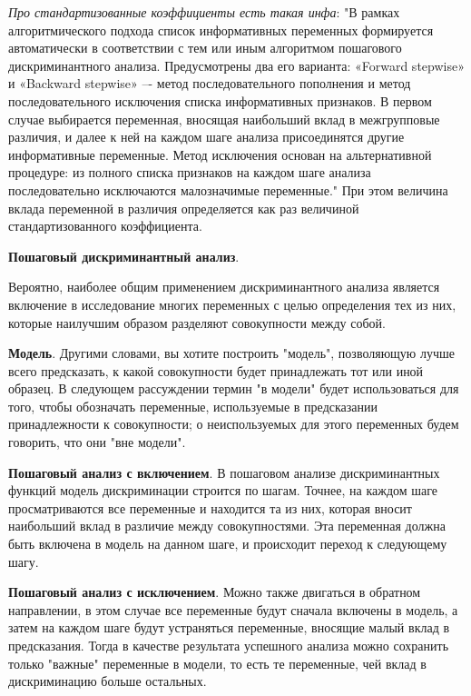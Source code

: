 \documentclass[a4paper, 12pt]{article}
\begin{document}
{\it Про стандартизованные коэффициенты есть такая инфа}: "В рамках алгоритмического подхода список информативных
переменных формируется автоматически в соответствии с тем
или иным алгоритмом пошагового дискриминантного анализа.
Предусмотрены два его варианта: «Forward stepwise» и
«Backward stepwise» –- метод последовательного пополнения и
метод последовательного исключения списка информативных
признаков. В первом случае выбирается переменная, вносящая
наибольший вклад в межгрупповые различия, и далее к ней на
каждом шаге анализа присоединятся другие информативные переменные. Метод исключения основан на альтернативной процедуре: из полного списка признаков на каждом шаге анализа последовательно исключаются малозначимые переменные." При этом величина вклада переменной в различия определяется как раз величиной стандартизованного коэффициента.

\textbf{Пошаговый дискриминантный анализ}.

Вероятно, наиболее общим применением дискриминантного анализа является включение в исследование многих переменных с целью определения тех из них, которые наилучшим образом разделяют совокупности между собой.

\textbf{Модель}. Другими словами, вы хотите построить "модель", позволяющую лучше всего предсказать, к какой совокупности будет принадлежать тот или иной образец. В следующем рассуждении термин "в модели" будет использоваться для того, чтобы обозначать переменные, используемые в предсказании принадлежности к совокупности; о неиспользуемых для этого переменных будем говорить, что они "вне модели".

\textbf{Пошаговый анализ с включением}. В пошаговом анализе дискриминантных функций модель дискриминации строится по шагам. Точнее, на каждом шаге просматриваются все переменные и находится та из них, которая вносит наибольший вклад в различие между совокупностями. Эта переменная должна быть включена в модель на данном шаге, и происходит переход к следующему шагу.

\textbf{Пошаговый анализ с исключением}. Можно также двигаться в обратном направлении, в этом случае все переменные будут сначала включены в модель, а затем на каждом шаге будут устраняться переменные, вносящие малый вклад в предсказания. Тогда в качестве результата успешного анализа можно сохранить только "важные" переменные в модели, то есть те переменные, чей вклад в дискриминацию больше остальных.
\end{document}
